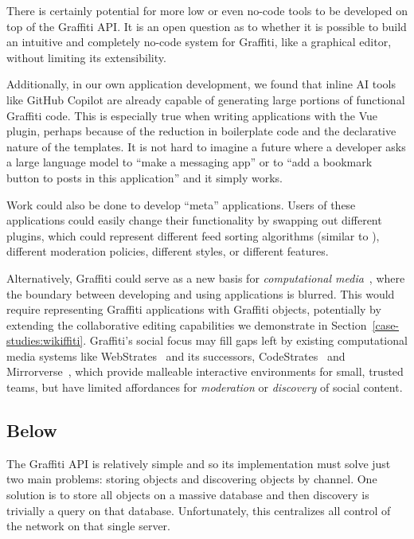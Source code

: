 There is certainly potential for more low or even no-code tools
to be developed on top of the Graffiti API. It is an open
question as to whether it is possible to build an intuitive and completely
no-code system for Graffiti, like a graphical editor, without limiting
its extensibility.

Additionally, in our own application development,
we found that inline AI tools like GitHub Copilot are already
capable of generating large portions of functional Graffiti code.
This is especially true when writing applications with the
Vue plugin, perhaps because of the reduction in boilerplate
code and the declarative nature of the templates.
It is not hard to imagine a future where a developer asks
a large language model to ``make a messaging app''
or to ``add a bookmark button to posts in this application'' and
it simply works.

Work could also be done to develop ``meta'' applications.
Users of these applications could easily change their functionality
by swapping out different plugins,
which could represent different feed sorting algorithms
(similar to \cite{threeleggedstool, bluesky}),
different moderation policies, different styles,
or different features.

Alternatively, Graffiti could serve as a new basis for
\emph{computational media}~{\cite{computationalmedia}},
where the boundary between developing and using applications is blurred.
This would require representing Graffiti applications with
Graffiti objects, potentially by extending the
collaborative editing capabilities we demonstrate in Section~{\ref{case-studies:wikiffiti}}.
Graffiti's social focus may fill gaps left by existing computational media
systems like WebStrates~{\cite{webstrates}} and its successors, CodeStrates~{\cite{codestrates}}
and Mirrorverse~{\cite{mirrorverse}}, which provide malleable interactive environments
for small, trusted teams, but have limited affordances
for \emph{moderation} or \emph{discovery} of social content.

\subsection{Below}

The Graffiti API is relatively simple
and so its implementation must solve just two main problems:
storing objects and discovering objects by channel.
One solution is to store all objects on a massive database
and then discovery is trivially a query on that database.
Unfortunately, this centralizes all control of the network
on that single server.

